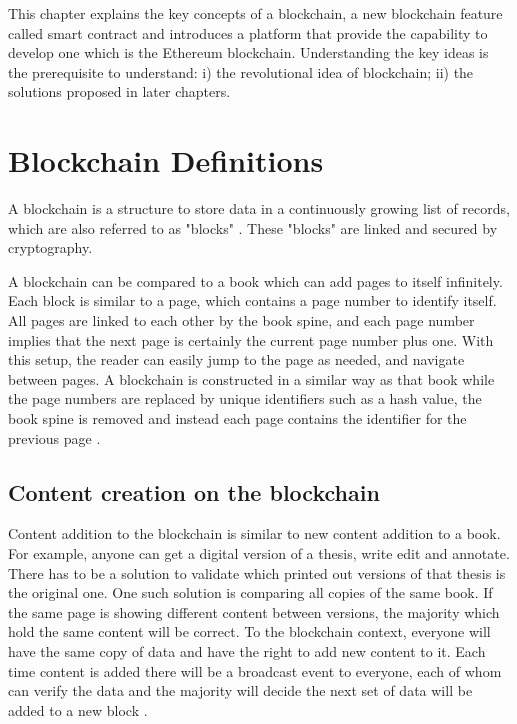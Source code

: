 \documentclass[twoside,numperchapter]{tutthesis} %
\begin{document}
This chapter explains the key concepts of a blockchain, a new blockchain feature called smart contract and introduces a platform that provide the capability to develop one which is the Ethereum blockchain. Understanding the key ideas is the prerequisite to understand: i) the revolutional idea of blockchain; ii) the solutions proposed in later chapters.

\section{Blockchain Definitions}

A blockchain is a structure to store data in a continuously growing list of records, which are also referred to as "blocks" \citep{RefWorks:doc:WhatIsBlockChain}. These "blocks" are linked and secured by cryptography.

A blockchain can be compared to a book which can add pages to itself infinitely. Each block is similar to a page, which contains a page number to identify itself. All pages are linked to each other by the book spine, and each page number implies that the next page is certainly the current page number plus one. With this setup, the reader can easily jump to the page as needed, and navigate between pages. A blockchain is constructed in a similar way as that book while the page numbers are replaced by unique identifiers such as a hash value, the book spine is removed and instead each page contains the identifier for the previous page \citep{RefWorks:doc:BlockchainBasicsBook}.

\subsection{Content creation on the blockchain}
\label{contentCreationOnBlockchain}

Content addition to the blockchain is similar to new content addition to a book. For example, anyone can get a digital version of a thesis, write edit and annotate. There has to be a solution to validate which printed out versions of that thesis is the original one. One such solution is comparing all copies of the same book. If the same page is showing different content between versions, the majority which hold the same content will be correct. To the blockchain context, everyone will have the same copy of data and have the right to add new content to it. Each time content is added there will be a broadcast event to everyone, each of whom can verify the data and the majority will decide the next set of data will be added to a new block \citep{RefWorks:doc:BitcoinWhitepaper}.
\end{document}
